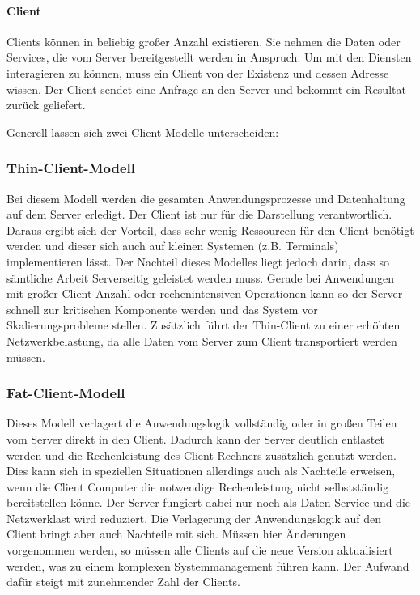 	\paragraph{Client}
	Clients können in beliebig großer Anzahl existieren. Sie nehmen die Daten oder Services, die vom Server bereitgestellt werden in Anspruch. Um mit den Diensten interagieren zu können, muss ein Client von der Existenz und dessen Adresse wissen. Der Client sendet eine Anfrage an den Server und bekommt ein Resultat zurück geliefert. 	
	
	
	Generell lassen sich zwei Client-Modelle unterscheiden:
	\subsubsection{Thin-Client-Modell}
	Bei diesem Modell werden die gesamten Anwendungsprozesse und Datenhaltung auf dem Server erledigt. Der Client ist nur für die Darstellung verantwortlich. Daraus ergibt sich der Vorteil, dass sehr wenig Ressourcen für den Client benötigt werden und dieser sich auch auf kleinen Systemen (z.B. Terminals) implementieren lässt. Der Nachteil dieses Modelles liegt jedoch darin, dass so sämtliche Arbeit Serverseitig geleistet werden muss. Gerade bei Anwendungen mit großer Client Anzahl oder rechenintensiven Operationen kann so der Server schnell zur kritischen Komponente werden und das System vor Skalierungsprobleme stellen. Zusätzlich führt der Thin-Client zu einer erhöhten Netzwerkbelastung, da alle Daten vom Server zum Client transportiert werden müssen.
	
	\subsubsection{Fat-Client-Modell}
	Dieses Modell verlagert die Anwendungslogik vollständig oder in großen Teilen vom Server direkt in den Client. Dadurch kann der Server deutlich entlastet werden und die Rechenleistung des Client Rechners zusätzlich genutzt werden. Dies kann sich in speziellen Situationen allerdings auch als Nachteile erweisen, wenn die Client Computer die notwendige Rechenleistung nicht selbstständig bereitstellen könne. Der Server fungiert dabei nur noch als Daten Service und die Netzwerklast wird reduziert. Die Verlagerung der Anwendungslogik auf den Client bringt aber auch Nachteile mit sich. Müssen hier Änderungen vorgenommen werden, so müssen alle Clients auf die neue Version aktualisiert werden, was zu einem komplexen Systemmanagement führen kann. Der Aufwand dafür steigt mit zunehmender Zahl der Clients.
	
